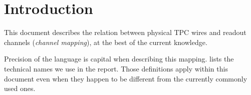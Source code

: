 \section{Introduction}
\label{sec:intro}

This document describes the relation between physical TPC wires and readout
channels (\emph{channel mapping}), at the best of the current knowledge.

Precision of the language is capital when describing this mapping.
 lists the technical names we use in the report.
Those definitions apply within this document even when they happen to be
different from the currently commonly used ones.

\begin{center} %
    \noindent{}
\end{center}